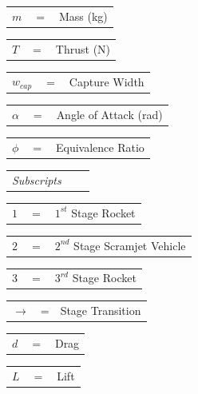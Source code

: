 \documentclass[]{aiaa-tc}
\begin{document}
	  	\begin{tabular}{p{1.2cm}p{1cm}p{5cm}}
	  $m$ & $=$ & Mass (kg)\\
	  	\end{tabular} 
	  	\begin{tabular}{p{1.2cm}p{1cm}p{5cm}}
	  $T$ & $=$ & Thrust (N)\\
	  	\end{tabular} 
	  	\begin{tabular}{p{1.2cm}p{1cm}p{5cm}}
	  $w_{cap}$ & $=$ & Capture Width\\
	  	\end{tabular} 
	  	\begin{tabular}{p{1.2cm}p{1cm}p{5cm}}
	  		$\alpha$ & $=$ & Angle of Attack (rad)\\
	  	\end{tabular} 	
	  	\begin{tabular}{p{1.2cm}p{1cm}p{5cm}}
	  		$\phi$ & $=$ & Equivalence Ratio\\
	  	\end{tabular} 
	  	\newline  	
	  	\begin{tabular}{p{5.2cm}p{1cm}p{5cm}}


\textit{Subscripts} \\
\end{tabular} 
\newline
\begin{tabular}{p{1.2cm}p{1cm}p{5cm}}
$1$ & $=$ & $1^{st}$ Stage Rocket\\
\end{tabular} 
\begin{tabular}{p{1.2cm}p{1cm}p{5cm}}
	$2$ & $=$ & $2^{nd}$ Stage Scramjet Vehicle\\
		\end{tabular} 
		\begin{tabular}{p{1.2cm}p{1cm}p{5cm}}
	$3$ & $=$ & $3^{rd}$ Stage Rocket\\
		\end{tabular} 
		\begin{tabular}{p{1.2cm}p{1cm}p{5cm}}
	$\rightarrow$ & = & Stage Transition\\
		\end{tabular} 
		\begin{tabular}{p{1.2cm}p{1cm}p{5cm}}
	$d$ & $=$ & Drag\\
		\end{tabular} 
		\begin{tabular}{p{1.2cm}p{1cm}p{5cm}}
	$L$ & $=$ & Lift\\
		\end{tabular} 
\end{document}
